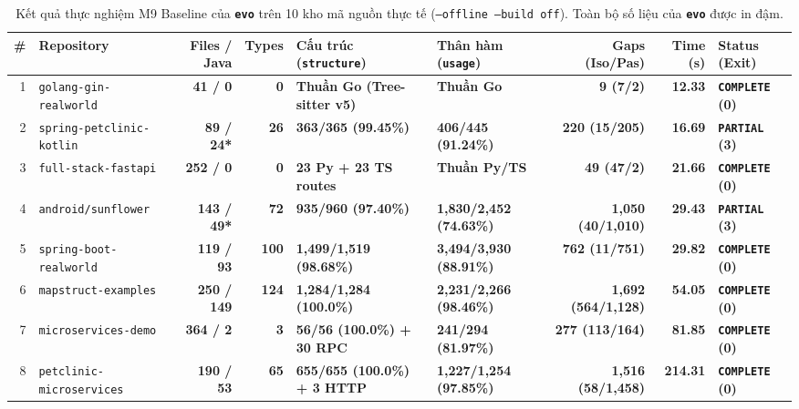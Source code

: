 \documentclass[10pt,a4paper]{article}
\begin{document}
\begin{table}[htbp]
\centering
\caption{Kết quả thực nghiệm M9 Baseline của \textbf{\texttt{evo}} trên 10 kho mã nguồn thực tế (\texttt{--offline --build off}). Toàn bộ số liệu của \textbf{\texttt{evo}} được in đậm.}
\label{tab:m9}
\scriptsize
\renewcommand{\arraystretch}{1.22}
\begin{tabularx}{\textwidth}{r >{\raggedright\arraybackslash}p{3.0cm} r r >{\raggedright\arraybackslash}p{2.3cm} >{\raggedright\arraybackslash}p{2.2cm} r r >{\raggedright\arraybackslash}p{2.5cm}}
\toprule
\textbf{\#} & \textbf{Repository} & \textbf{Files / Java} & \textbf{Types} & \textbf{Cấu trúc (\texttt{structure})} & \textbf{Thân hàm (\texttt{usage})} & \textbf{Gaps (Iso/Pas)} & \textbf{Time (s)} & \textbf{Status (Exit)} \\
\midrule
1 & \texttt{golang-gin-realworld} & \textbf{41 / 0} & \textbf{0} & \textbf{Thuần Go (Tree-sitter v5)} & \textbf{Thuần Go} & \textbf{9 (7/2)} & \textbf{12.33} & \textbf{\texttt{COMPLETE} (0)} \\
2 & \texttt{spring-petclinic-kotlin} & \textbf{89 / 24*} & \textbf{26} & \textbf{363/365 (99.45\%)} & \textbf{406/445 (91.24\%)} & \textbf{220 (15/205)} & \textbf{16.69} & \textbf{\texttt{PARTIAL} (3)} \\
3 & \texttt{full-stack-fastapi} & \textbf{252 / 0} & \textbf{0} & \textbf{23 Py + 23 TS routes} & \textbf{Thuần Py/TS} & \textbf{49 (47/2)} & \textbf{21.66} & \textbf{\texttt{COMPLETE} (0)} \\
4 & \texttt{android/sunflower} & \textbf{143 / 49*} & \textbf{72} & \textbf{935/960 (97.40\%)} & \textbf{1,830/2,452 (74.63\%)} & \textbf{1,050 (40/1,010)} & \textbf{29.43} & \textbf{\texttt{PARTIAL} (3)} \\
5 & \texttt{spring-boot-realworld} & \textbf{119 / 93} & \textbf{100} & \textbf{1,499/1,519 (98.68\%)} & \textbf{3,494/3,930 (88.91\%)} & \textbf{762 (11/751)} & \textbf{29.82} & \textbf{\texttt{COMPLETE} (0)} \\
6 & \texttt{mapstruct-examples} & \textbf{250 / 149} & \textbf{124} & \textbf{1,284/1,284 (100.0\%)} & \textbf{2,231/2,266 (98.46\%)} & \textbf{1,692 (564/1,128)} & \textbf{54.05} & \textbf{\texttt{COMPLETE} (0)} \\
7 & \texttt{microservices-demo} & \textbf{364 / 2} & \textbf{3} & \textbf{56/56 (100.0\%) + 30 RPC} & \textbf{241/294 (81.97\%)} & \textbf{277 (113/164)} & \textbf{81.85} & \textbf{\texttt{COMPLETE} (0)} \\
8 & \texttt{petclinic-microservices} & \textbf{190 / 53} & \textbf{65} & \textbf{655/655 (100.0\%) + 3 HTTP} & \textbf{1,227/1,254 (97.85\%)} & \textbf{1,516 (58/1,458)} & \textbf{214.31} & \textbf{\texttt{COMPLETE} (0)} \\

\end{tabularx}
\end{table}
\end{document}
